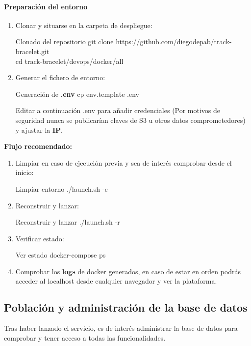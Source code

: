 \documentclass[12pt, a4paper]{article}
\begin{document}
\begin{umaappendices}
	\paragraph{Preparación del entorno}
	\begin{enumerate}
		\item Clonar y situarse en la carpeta de despliegue:
		\begin{Terminal}{Clonado del repositorio}
			git clone https://github.com/diegodepab/track-bracelet.git \\
			cd track-bracelet/devops/docker/all
		\end{Terminal}
		\item Generar el fichero de entorno:
		\begin{Terminal}{Generación de \textbf{.env}}
			cp env.template .env
		\end{Terminal}
		Editar a continuación .env para añadir credenciales (Por motivos de seguridad nunca se publicarían claves de S3 u otros datos comprometedores) y ajustar la \textbf{IP}.
	\end{enumerate}
	
	
	\textbf{Flujo recomendado:}
	\begin{enumerate}
		\item Limpiar en caso de ejecución previa y sea de interés comprobar desde el inicio:
		\begin{Terminal}{Limpiar entorno}
			./launch.sh -c
		\end{Terminal}
		\item Reconstruir y lanzar:
		\begin{Terminal}{Reconstruir y lanzar}
			./launch.sh -r
		\end{Terminal}
		\item Verificar estado:
		\begin{Terminal}{Ver estado}
			docker-compose ps
		\end{Terminal}
		\item Comprobar los \textbf{logs} de docker generados, en caso de estar en orden podrás acceder al localhost desde cualquier navegador y ver la plataforma. 
	\end{enumerate}
	
	\newpage
	\subsection{Población y administración de la base de datos}
	\label{sec:seed_db}
	
	Tras haber lanzado el servicio, es de interés administrar la base de datos para comprobar y tener acceso a todas las funcionalidades.
	

\end{umaappendices}
\end{document}
